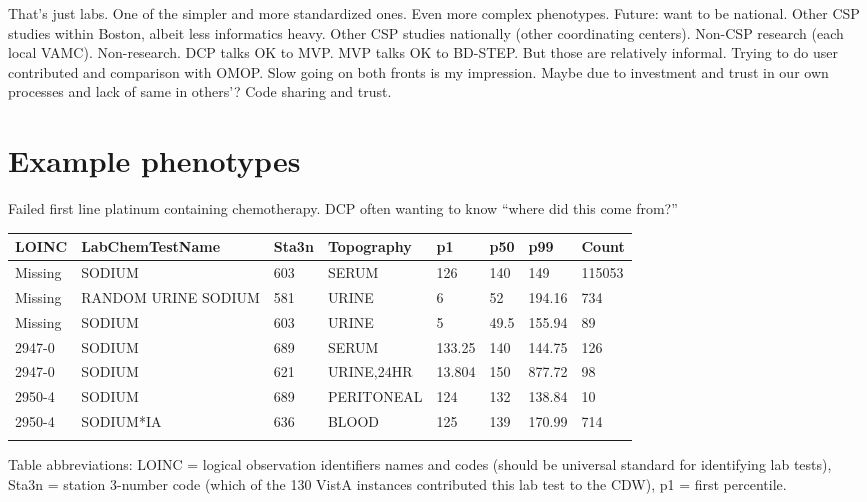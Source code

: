\documentclass{tufte-handout}
\begin{document}
That's just labs. One of the simpler and more standardized ones. Even
more complex phenotypes. Future: want to be national. Other CSP
studies within Boston, albeit less informatics heavy. Other CSP
studies nationally (other coordinating centers). Non-CSP research
(each local VAMC). Non-research. DCP talks OK to MVP. MVP talks OK to
BD-STEP. But those are relatively informal. Trying to do user
contributed and comparison with OMOP. Slow going on both fronts is my
impression. Maybe due to investment and trust in our own processes and
lack of same in others'? Code sharing and trust.


\section{Example phenotypes}


Failed first line platinum containing chemotherapy. DCP often
wanting to know ``where did this come from?''

\noindent \begin{tabular}{llllllll}
\\
\hline
LOINC & LabChemTestName & Sta3n & Topography & p1 & p50 & p99 & Count\\
\hline
Missing & SODIUM & 603 & SERUM & 126 & 140 & 149 & 115053\\
Missing & RANDOM URINE SODIUM & 581 & URINE & 6 & 52 & 194.16 & 734\\
Missing & SODIUM & 603 & URINE & 5 & 49.5 & 155.94 & 89\\
2947-0 & SODIUM & 689 & SERUM & 133.25 & 140 & 144.75 & 126\\
2947-0 & SODIUM & 621 & URINE,24HR & 13.804 & 150 & 877.72 & 98\\
2950-4 & SODIUM & 689 & PERITONEAL & 124 & 132 & 138.84 & 10\\
2950-4 & SODIUM*IA & 636 & BLOOD & 125 & 139 & 170.99 & 714\\
\hline
\\
\end{tabular}

Table abbreviations: LOINC = logical observation identifiers names and
codes (should be universal standard for identifying lab tests), Sta3n
= station 3-number code (which of the 130 VistA instances contributed
this lab test to the CDW), p1 = first percentile.
\end{document}
